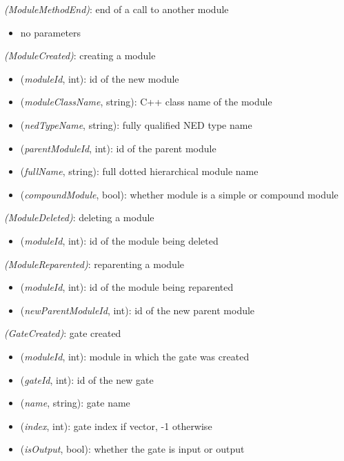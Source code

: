  \textit{(ModuleMethodEnd)}: end of a call to another module

\begin{itemize}
  \item no parameters
\end{itemize}

 \textit{(ModuleCreated)}: creating a module

\begin{itemize}
  \item {} (\textit{moduleId}, int): id of the new module
  \item {} (\textit{moduleClassName}, string): C++ class name of the module
  \item {} (\textit{nedTypeName}, string): fully qualified NED type name
  \item {} (\textit{parentModuleId}, int): id of the parent module
  \item {} (\textit{fullName}, string): full dotted hierarchical module name
  \item {} (\textit{compoundModule}, bool): whether module is a simple or compound module
\end{itemize}

 \textit{(ModuleDeleted)}: deleting a module

\begin{itemize}
  \item {} (\textit{moduleId}, int): id of the module being deleted
\end{itemize}

 \textit{(ModuleReparented)}: reparenting a module

\begin{itemize}
  \item {} (\textit{moduleId}, int): id of the module being reparented
  \item {} (\textit{newParentModuleId}, int): id of the new parent module
\end{itemize}

 \textit{(GateCreated)}: gate created

\begin{itemize}
  \item {} (\textit{moduleId}, int): module in which the gate was created
  \item {} (\textit{gateId}, int): id of the new gate
  \item {} (\textit{name}, string): gate name
  \item {} (\textit{index}, int): gate index if vector, -1 otherwise
  \item {} (\textit{isOutput}, bool): whether the gate is input or output
\end{itemize}

